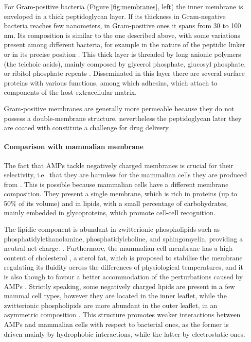 For Gram-positive bacteria (Figure \ref{fig:membranes}, left) the inner membrane is enveloped in a thick peptidoglycan layer. If its thickness in Gram-negative bacteria reaches few nanometers, in Gram-positive ones it spans from 30 to 100 nm. Its composition is similar to the one described above, with some variations present among different bacteria, for example in the nature of the peptidic linker or in its precise position \citep{Vollmer2008}. This thick layer is threaded by long anionic polymers (the teichoic acids), mainly composed by glycerol phosphate, glucosyl phosphate, or ribitol phosphate repeats \citep{Swoboda2009}. Disseminated in this layer there are several surface proteins with various functions, among which adhesins, which attach to components of the host extracellular matrix.

Gram-positive membranes are generally more permeable because they do not possess a double-membrane structure, nevertheless the peptidoglycan later they are coated with constitute a challenge for drug delivery.


\paragraph{Comparison with mammalian membrane}
The fact that AMPs tackle negatively charged membranes is crucial for their selectivity, i.e.\ that they are harmless for the mammalian cells they are produced from \citep{Glukhov2005}. This is possible because mammalian cells have a different membrane composition. They present a single membrane, which is rich in proteins (up to 50\% of its volume) and in lipids, with a small percentage of carbohydrates, mainly embedded in glycoproteins, which promote cell-cell recognition.

The lipidic component is abundant in zwitterionic phospholipids such as phosphatidylethanolamine, phosphatidylcholine, and sphingomyelin, providing a neutral net charge. \citep{Spector1985,vanMeer2008}.
%
Furthermore, the mammalian cell membrane has a high content of cholesterol \citep{Yeaman2003, Lai2009}, a sterol fat, which is proposed to stabilise the membrane regulating its fluidity across the differences of physiological temperatures, and it is also though to favour a better accommodation of the perturbations caused by AMPs \citep{Zasloff2002}.
%
Strictly speaking, some negatively charged lipids are present in a few mammal cell types, however they are located in the inner leaflet, while the zwitterionic phospholipids are more abundant in the outer leaflet, in an asymmetric composition \citep{vanMeer2008,Matsuzaki2009}.
%
This structure promotes weaker interactions between AMPs and mammalian cells with respect to bacterial ones, as the former is driven mainly by hydrophobic interactions, while the latter by electrostatic ones.

